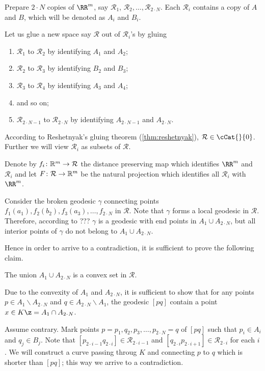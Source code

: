 Prepare $2\cdot N$ copies of $\RR^m$,
say $\mathcal{R}_1$, $\mathcal{R}_2,\dots,\mathcal{R}_{2\cdot N}$.
Each $\mathcal{R}_i$ contains a copy of $A$ and $B$, which will be denoted as $A_i$ and $B_i$.

Let us glue a new space say $\mathcal{R}$ out of $\mathcal{R}_i$'s
by gluing 
\begin{enumerate}
\item $\mathcal{R}_1$ to $\mathcal{R}_2$ by identifying $A_1$ and $A_2$;
\item $\mathcal{R}_2$ to $\mathcal{R}_3$  by identifying $B_2$ and $B_3$;
\item $\mathcal{R}_3$ to $\mathcal{R}_4$  by identifying $A_3$ and $A_4$;
\item and so on;
\item $\mathcal{R}_{2\cdot N-1}$ to $\mathcal{R}_{2\cdot N}$ by identifying $A_{2\cdot N-1}$ and $A_{2\cdot N}$.
\end{enumerate}
According to Reshetnyak's gluing theorem (\ref{thm:reshetnyak}), $\mathcal{R}\in\cCat{}{0}$.
Further we will view $\mathcal{R}_i$ as subsets of $\mathcal{R}$.

Denote by $f_i\:\RR^m\to\mathcal{R}$ the distance preserving map which identifies $\RR^m$ and $\mathcal{R}_i$
and let $F\:\mathcal{R} \to \RR^m$ be the natural projection which identifies all $\mathcal{R}_i$ with $\RR^m$.

Consider the broken geodesic $\gamma$ connecting points $f_1(a_1),f_2(b_2),f_3(a_3),\dots,f_{2\cdot N}$ in $\mathcal{R}$.
Note that $\gamma$ forms a local geodesic in $\mathcal{R}$.
Therefore, according to ??? $\gamma$ is a geodesic with end points in $A_1\cup A_{2\cdot N}$,
but all interior points of $\gamma$ do not belong to $A_1\cup A_{2\cdot N}$.

Hence in order to arrive to a contradiction, 
it is sufficient to prove the following claim.
 
\begin{clm}{}
The union $A_1\cup A_{2\cdot N}$ is a convex set in $\mathcal{R}$.
\end{clm}

Due to the convexity of $A_1$ and $A_{2\cdot N}$,
it is sufficient to show that for any points $p\in A_1\backslash A_{2\cdot N}$ and $q\in A_{2\cdot N}\backslash A_1$,
the geodesic $[pq]$ contain a point $x\in K\z=A_1\cap A_{2\cdot N}$.

Assume contrary.
Mark points $p=p_1,q_2,p_3,\dots,p_{2\cdot N}=q$ of $[pq]$ such that $p_i\in A_i$ and $q_j\in B_j$.
Note that $[p_{2\cdot i-1}q_{2\cdot i}]\in \mathcal{R}_{2\cdot i-1}$ 
and 
$[q_{2\cdot i}p_{2\cdot i+1}]\in \mathcal{R}_{2\cdot i}$ for each $i$.
We will construct a curve passing throug $K$ and connecting $p$ to $q$ which is shorter than $[pq]$;
this way we arrive to a contradiction. 




